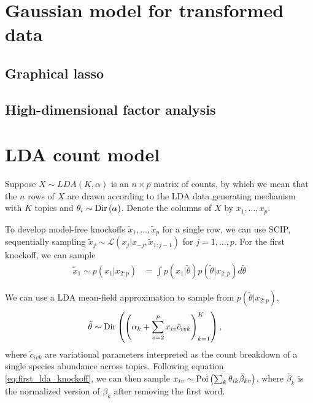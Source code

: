 \documentclass{article}
\begin{document}
\section{Gaussian model for transformed data}
\label{sec:mf_gaussian_model}

\subsection{Graphical lasso}
\label{subsec:graphical_lasso}


\subsection{High-dimensional factor analysis}
\label{subsec:factor_analysis}

\section{LDA count model}
\label{sec:lda_count_model}

Suppose $X \sim LDA\left(K, \alpha\right)$ is an $n \times p$ matrix of counts,
by which we mean that the $n$ rows of $X$ are drawn according to the LDA data
generating mechanism with $K$ topics and $\theta_{i} \sim
\textnormal{Dir}\left(\alpha\right)$. Denote the columns of $X$ by $x_{1}, \dots, x_{p}$.

To develop model-free knockoffs $\tilde{x}_{1}, \dots, \tilde{x}_{p}$ for a
single row, we can use SCIP, sequentially sampling $\tilde{x}_{j} \sim
\mathcal{L}\left(x_{j} \vert x_{-j}, \tilde{x}_{1:j - 1}\right)$ for $j = 1,
\dots, p$. For the first knockoff, we can sample
\begin{align}
  \label{eq:first_lda_knockoff}
  \tilde{x}_{1} \sim p\left(x_{1} \vert x_{2:p}\right) &= \int p\left(x_{1} \vert \tilde{\theta}\right)p\left(\tilde{\theta} \vert x_{2:p}\right) d\tilde{\theta}
\end{align}

We can use a LDA mean-field approximation to sample from $p\left(\tilde{\theta}
\vert x_{2:p}\right)$,
\begin{align*}
  \tilde{\theta} &\sim \textnormal{Dir}\left(\left(\alpha_{k} + \sum_{v = 2}^{p} x_{iv} \tilde{c}_{ivk}\right)_{k= 1}^{K}\right),
\end{align*}
where $\tilde{c}_{ivk}$ are variational parameters interpreted as the count
breakdown of a single species abundance across topics. Following equation
\ref{eq:first_lda_knockoff}, we can then sample $x_{iv} \sim \textnormal{Poi}\left(\sum_{k}
\theta_{ik} \bar{\beta}_{kv}\right)$, where $\bar{\beta}_{k}$ is the
normalized version of $\beta_{k}$ after removing the first word.
\end{document}
